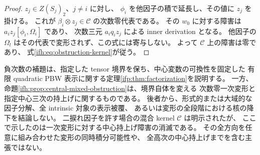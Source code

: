 \begin{proof}
$z_j\in Z(S_j)_2$、$j\ne i$ に対し、
$\phi_i$ を他因子の積で延長し、その値に $z_j$ を掛ける。
これが $\beta_i\otimes z_j\in\mathcal C$ の次数零代表である。
その $w_0$ に対する障害は $a_i z_j[\phi_i,\Omega_i]$ であり、
次数三元 $a_iq_i z_j$ による inner derivation となる。
他因子の $\Omega_l$ はその代表で変形されず、この式には寄与しない。
よって $\mathcal C$ 上の障害は零であり、
式\eqref{ifh:eq:obstruction-kernel}が従う。
\end{proof}

\begin{remark}[固定境界の有限分類と一次障害の区別]
\label{ifh:rem:scope}
負次数の補題は、指定した tensor 境界を保ち、中心変数の可換性を固定した
有限 quadratic PBW 表示に関する定理\ref{ifp:thm:factorization}を説明する。
一方、命題\ref{ifh:prop:central-mixed-obstruction}は、境界自体を変える
次数零一次変形と指定中心三次の持上げに関するものである。
後者から、形式的または大域的な因子分解、全 intrinsic 対象の表示被覆、
あるいは変形の全段階における核の降下を結論しない。
二捩れ因子を許す場合の混合 kernel $\mathcal C$ は明示されたが、
ここで示したのは一次変形に対する中心持上げ障害の消滅である。
その全方向を任意に組み合わせた変形の同時積分可能性や、
全高次の中心持上げまでを含む主張ではない。
\end{remark}
